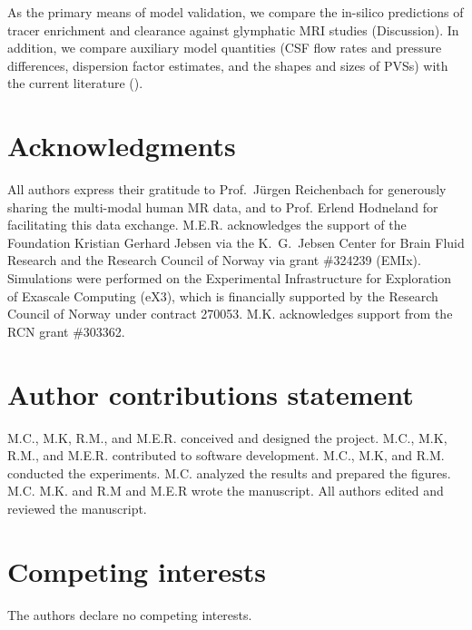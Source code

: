 \documentclass[fleqn,10pt]{wlscirep}
\begin{document}
As the primary means of model validation, we compare the in-silico
predictions of tracer enrichment and clearance against glymphatic MRI
studies (Discussion). In addition, we compare auxiliary model
quantities (CSF flow rates and pressure differences, dispersion factor
estimates, and the shapes and sizes of PVSs) with the current
literature ().

\section*{Acknowledgments}

All authors express their gratitude to Prof.~Jürgen Reichenbach for
generously sharing the multi-modal human MR data, and to Prof. Erlend
Hodneland for facilitating this data exchange. M.E.R. acknowledges the
support of the Foundation Kristian Gerhard Jebsen via the K.~G.~Jebsen
Center for Brain Fluid Research and the Research Council of Norway via
grant \#324239 (EMIx). Simulations were performed on the Experimental
Infrastructure for Exploration of Exascale Computing (eX3), which is
financially supported by the Research Council of Norway under contract
270053. M.K. acknowledges support from the RCN grant \#303362.

\section*{Author contributions statement}

M.C., M.K, R.M., and M.E.R. conceived and designed the project.
M.C., M.K, R.M., and M.E.R. contributed to software development. 
M.C., M.K, and R.M. conducted the experiments.
M.C. analyzed the results and prepared the figures.
M.C. M.K. and R.M and M.E.R wrote the manuscript. 
All authors edited and reviewed the manuscript.

\section*{Competing interests}

The authors declare no competing interests.



\newpage
\FloatBarrier
\appendix

\end{document}

